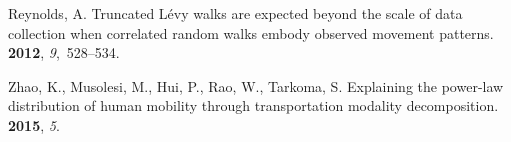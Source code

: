 \documentclass{elsart}
\begin{document}
\begin{thebibliography}{00}
Reynolds, A.
\newblock Truncated L{\'e}vy walks are expected beyond the scale of data
  collection when correlated random walks embody observed movement patterns.
 {\bf 2012}, {\em
  9},~528--534.

Zhao, K., Musolesi, M., Hui, P., Rao, W., Tarkoma, S.
\newblock Explaining the power-law distribution of human mobility through
  transportation modality decomposition.
 {\bf 2015}, {\em 5}.



\end{thebibliography}
\end{document}
